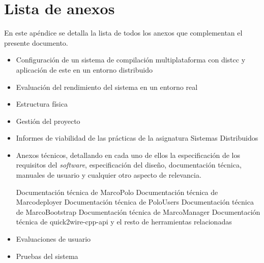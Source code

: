 \chapter{Lista de anexos}
\label{listaanexos}
En este apéndice se detalla la lista de todos los anexos que complementan el presente documento.

\begin{itemize}
\item Configuración de un sistema de compilación multiplataforma con distcc y aplicación de este en un entorno distribuido
\item Evaluación del rendimiento del sistema en un entorno real
\item Estructura física
\item Gestión del proyecto
\item Informes de viabilidad de las prácticas de la asignatura Sistemas Distribuidos
\item Anexos técnicos, detallando en cada uno de ellos la especificación de los requisitos del \textit{software}, especificación del diseño, documentación técnica, manuales de usuario y cualquier otro aspecto de relevancia.

\subitem Documentación técnica de MarcoPolo
\subitem Documentación técnica de Marcodeployer
\subitem Documentación técnica de PoloUsers
\subitem Documentación técnica de MarcoBootstrap
\subitem Documentación técnica de MarcoManager
\subitem Documentación técnica de quick2wire-cpp-api y el resto de herramientas relacionadas


\item Evaluaciones de usuario
\item Pruebas del sistema
\end{itemize}